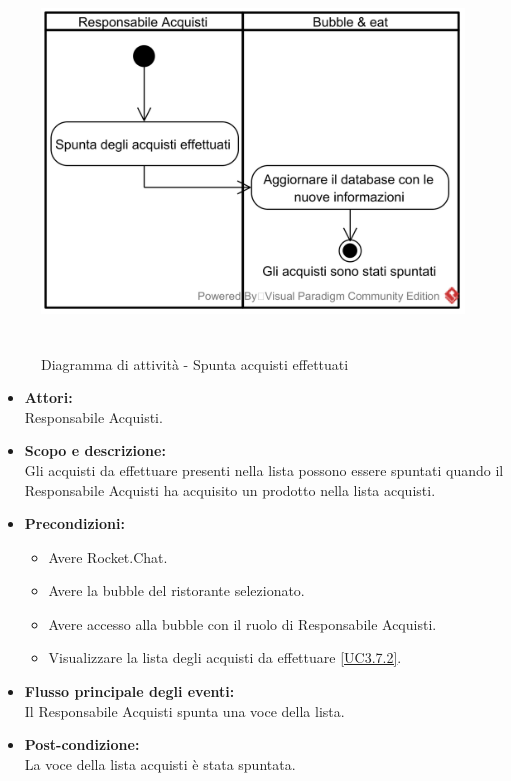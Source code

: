 \begin{figure}[H]
	\centering
	\includegraphics[height=10cm]{../../documenti/AnalisiDeiRequisiti/Diagrammi_img/attivita/uc_bubble_spunta_acquisti.png}
	\caption{Diagramma di attività - Spunta acquisti effettuati}
\end{figure}

\begin{itemize}
	\item \textbf{Attori:}
	\\Responsabile Acquisti.
	\item \textbf{Scopo e descrizione:} 
	\\Gli acquisti da effettuare presenti nella lista possono essere spuntati quando il Responsabile Acquisti ha acquisito un prodotto nella lista acquisti.
	\item \textbf{Precondizioni:}
	\begin{itemize}
		\item Avere Rocket.Chat.
		\item Avere la bubble del ristorante selezionato.
		\item Avere accesso alla bubble con il ruolo di Responsabile Acquisti.
		\item Visualizzare la lista degli acquisti da effettuare \ref{UC3.7.2}.
	\end{itemize}
	\item \textbf{Flusso principale degli eventi:}
	\\Il Responsabile Acquisti spunta una voce della lista.
	\item \textbf{Post-condizione:}
	\\La voce della lista acquisti è stata spuntata.
\end{itemize}

